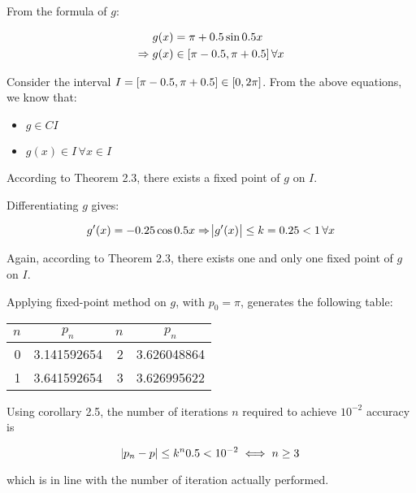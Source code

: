 \documentclass[../../../../Assignments]{subfiles}
\begin{document}
\begin{solution}
    From the formula of \(g\):

    \[\begin{aligned}
                    g(x) & = \pi + \num{0.5} \sin{\num{0.5} x} \\
        \Rightarrow g(x) & \in \interval{\pi - \num{0.5}}{\pi + \num{0.5}} \, \forall x
    \end{aligned}\]

    Consider the interval \(I = \interval{\pi - \num{0.5}}{\pi + \num{0.5}} \in
    \interval{0}{2 \pi}\). From the above equations, we know that:

    \begin{itemize}
        \item \(g \in C I\)
        \item \(g(x) \in I \, \forall x \in I\)
    \end{itemize}

    According to Theorem 2.3, there exists a fixed point of \(g\) on \(I\).

    Differentiating \(g\) gives:

    \[g'(x) = -\num{0.25} \cos{\num{0.5} x} \Rightarrow \abs{g'(x)} \leq k = \num{0.25} < 1 \, \forall x\]

    Again, according to Theorem 2.3, there exists one and only one fixed point
    of \(g\) on \(I\).

    Applying fixed-point method on \(g\), with \(p_0 = \pi\), generates the
    following table:

    \begin{table}[H]
        \centering
        \begin{tabular}{r S[table-format=1.9] r S[table-format=1.9]}
            \toprule
            \(n\)  &   {\(p_n\)}   &  \(n\)  &   {\(p_n\)}   \\
              &  3.141592654  &      2  &  3.626048864  \\
                1  &  3.641592654  &      3  &  3.626995622  \\
            \bottomrule
        \end{tabular}
    \end{table}

    Using corollary 2.5, the number of iterations \(n\) required to achieve
    \(10^{-2}\) accuracy is

    \[\abs{p_n - p} \leq k^n \num{0.5} < 10^{-2} \iff n \geq 3\]

    \noindent which is in line with the number of iteration actually performed.
\end{solution}
\end{document}
